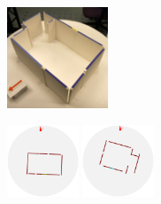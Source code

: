 \begin{figure}[t]
\begin{center}
\includegraphics[width=0.27\textwidth]{f2_63_original} %
\begin{minipage}[b]{0.72\textwidth} 
  \newcommand{\figwidth}{0.19\textwidth}
  \includegraphics[width=\figwidth]{f2_0_2D_walls_rotate} %
  \includegraphics[width=\figwidth]{f2_2_2D_walls_rotate} %

\end{minipage}
\end{center}
\end{figure}
